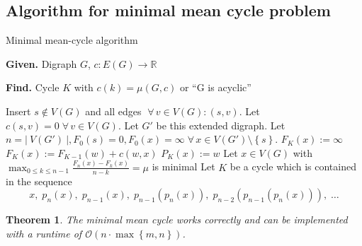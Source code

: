 \documentclass{article}
\newtheorem{theorem}{Theorem}
\newcommand{\card}[1]{\left|\:\!#1\:\!\right|}
\newcommand{\set}[1]{\left\{#1\right\}}
\newcommand{\given}[1]{\textbf{Given.} #1\par}
\newcommand{\find}[1]{\textbf{Find.} #1\par}
\newcommand{\fall}{\;\forall\,}
\begin{document}
\subsection{Algorithm for minimal mean cycle problem}
%
\begin{algorithm}
  \caption{Minimal mean-cycle algorithm}
  \label{mmc-algo}
  \given{Digraph $G$, $c: E(G) \rightarrow \mathbb{R}$}
  \find{Cycle $K$ with $c(k) = \mu(G, c)$ or ``G is acyclic''}
\begin{algorithmic}[1]
  \State Insert $s \notin V(G)$ and all edges $\fall v \in V(G): (s, v)$. Let $c(s, v) = 0 \fall v \in V(G)$. Let $G'$ be this extended digraph.
  \State Let $n = \card{V(G')}, F_0(s) = 0, F_0(x) = \infty \fall x \in V(G') \setminus \set{s}$.
      \State $F_K(x) := \infty$
      \For{all $(\card{w}, x) \in \delta^-(x)$}
          \State $F_K(x) := F_{K-1}(w) + c(w, x)$
          \State $P_K(x) := w$
        \EndIf
      \EndFor
    \EndFor
  \EndFor
  \If{$F_n(x) := \infty \fall x \in V(G') \setminus \set{s}$}
    \State {}
  \EndIf
  \State Let $x \in V(G)$ with $\max_{0 \leq k \leq n-1} \frac{F_n(x) - F_k(x)}{n-k} = \mu$ is minimal
  \State Let $K$ be a cycle which is contained in the sequence
    \[
      x,\;p_n(x),\;p_{n-1}(x),\;p_{n-1}(p_n(x)),\;p_{n-2}(p_{n-1}(p_n(x))),\;\ldots
    \]
  \State {}
\end{algorithmic}
\end{algorithm}


\begin{theorem}\label{korollar-3.11}
  The minimal mean cycle works correctly and can be implemented with a runtime of $\mathcal{O}(n \cdot\max\set{m,n})$.
\end{theorem}
\end{document}

